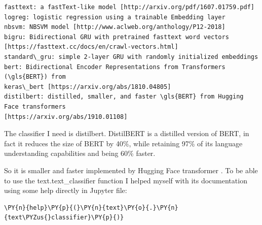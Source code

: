    \begin{Verbatim}[commandchars=\\\{\},fontsize=\footnotesize]
fasttext: a fastText-like model [http://arxiv.org/pdf/1607.01759.pdf]
logreg: logistic regression using a trainable Embedding layer
nbsvm: NBSVM model [http://www.aclweb.org/anthology/P12-2018]
bigru: Bidirectional GRU with pretrained fasttext word vectors
[https://fasttext.cc/docs/en/crawl-vectors.html]
standard\_gru: simple 2-layer GRU with randomly initialized embeddings
bert: Bidirectional Encoder Representations from Transformers (\gls{BERT}) from
keras\_bert [https://arxiv.org/abs/1810.04805]
distilbert: distilled, smaller, and faster \gls{BERT} from Hugging Face transformers
[https://arxiv.org/abs/1910.01108]
    \end{Verbatim}

The classifier I need is distilbert. DistilBERT \cite{sanh_distilbert_2020} is a distilled version of \gls{BERT}, in fact it reduces the size of \gls{BERT} by 40\%, while retaining 97\% of its language understanding capabilities and being 60\% faster.

So it is smaller and faster implemented by \gls{Hugging Face} transformer \cite{noauthor_distilbert_nodate}.
To be able to use the text.text\_classifier function I helped myself with its documentation using some help directly in Jupyter file:
 \begin{tcolorbox}[breakable, size=fbox, boxrule=1pt, pad at break*=1mm,colback=cellbackground, colframe=cellborder]
\begin{Verbatim}[commandchars=\\\{\},fontsize=\footnotesize]
\PY{n}{help}\PY{p}{(}\PY{n}{text}\PY{o}{.}\PY{n}{text\PYZus{}classifier}\PY{p}{)}
\end{Verbatim}
\end{tcolorbox}

